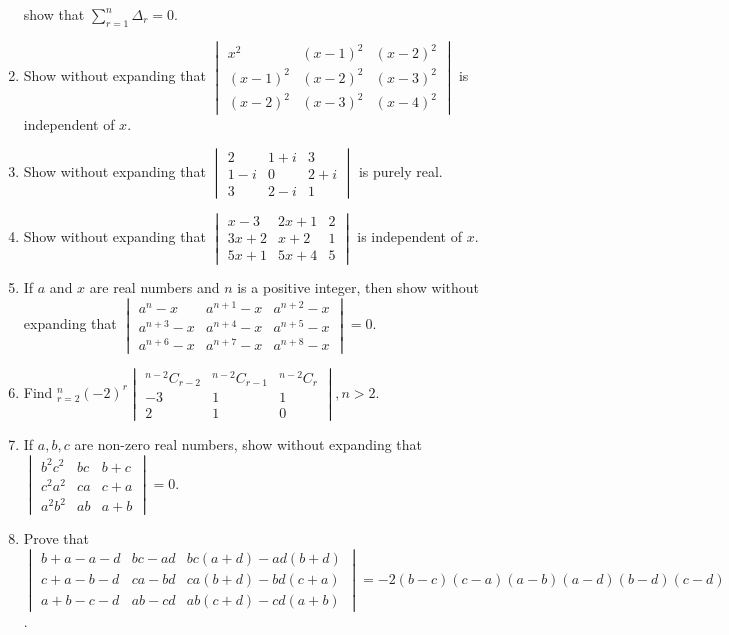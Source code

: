 \begin{enumerate}[resume]
  show that $\displaystyle\sum_{r=1}^n\Delta_r = 0$.
\item Show without expanding that $\begin{vmatrix}x^2 & (x - 1)^2 & (x - 2)^2\\(x - 1)^2 & (x - 2)^2 & (x - 3)^2\\(x - 2)^2 & (x -
  3)^2 & (x- 4)^2\end{vmatrix}$ is independent of $x$.
\item Show without expanding that $\begin{vmatrix}2 & 1 + i & 3\\ 1- i & 0 & 2 + i\\3 & 2 - i & 1\end{vmatrix}$ is purely real.
\item Show without expanding that $\begin{vmatrix}x - 3 & 2x + 1 & 2\\3x + 2 & x + 2 & 1\\5x + 1 & 5x + 4 & 5\end{vmatrix}$ is
  independent of $x$.
\item If $a$ and $x$ are real numbers and $n$ is a positive integer, then show without expanding that $\begin{vmatrix}a^n - x &
  a^{n + 1} - x & a^{n + 2} - x\\a^{n + 3} - x & a^{n + 4} - x & a^{n + 5} - x\\a^{n + 6} - x & a^{n + 7} - x & a^{n + 8} -
  x\end{vmatrix} = 0$.
\item Find $\displaystyle_{r=2}^n(-2)^r\begin{vmatrix}{}^{n - 2}C_{r - 2} & {}^{n - 2}C_{r - 1} & {}^{n - 2}C_r\\-3 & 1 & 1\\2 &
  1& 0\end{vmatrix}, n > 2$.
\item If $a, b, c$ are non-zero real numbers, show without expanding that $\begin{vmatrix}b^2c^2 & bc & b + c\\c^2a^2 & ca & c +
  a\\ a^2b^2 & ab & a + b\end{vmatrix} = 0$.
\item Prove that $\begin{vmatrix}b + a - a - d & bc - ad & bc(a + d) - ad(b + d)\\c + a - b - d & ca - bd & ca(b + d) - bd(c +
  a)\\ a + b - c - d & ab - cd & ab(c + d) - cd(a + b)\end{vmatrix} = -2(b - c)(c - a)(a - b)(a - d)(b - d)(c - d)$.

\end{enumerate}
